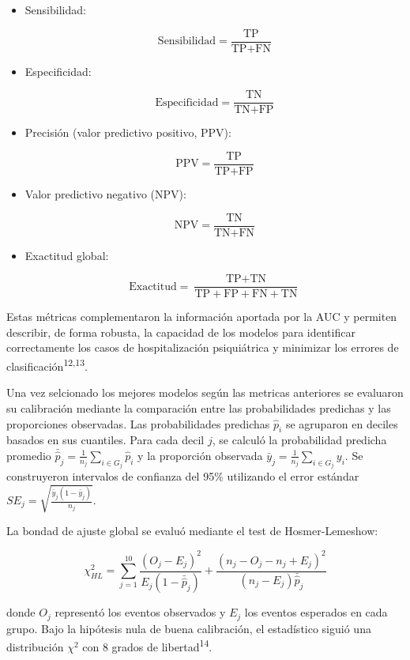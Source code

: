 \documentclass[
  spanish,
  10pt,
]{article}
\begin{document}
\begin{itemize}
\item
  Sensibilidad:

  \[
  \text{Sensibilidad} = \frac{\text{TP}}{\text{TP}+\text{FN}}
  \]
\item
  Especificidad:

  \[
  \text{Especificidad} = \frac{\text{TN}}{\text{TN}+\text{FP}}
  \]
\item
  Precisión (valor predictivo positivo, PPV):

  \[
  \text{PPV} = \frac{\text{TP}}{\text{TP}+\text{FP}}
  \]
\item
  Valor predictivo negativo (NPV):

  \[
  \text{NPV} = \frac{\text{TN}}{\text{TN}+\text{FN}}
  \]
\item
  Exactitud global:

  \[
  \text{Exactitud} = \frac{\text{TP}+\text{TN}}{\text{TP}+\text{FP}+\text{FN}+\text{TN}}
  \]
\end{itemize}

Estas métricas complementaron la información aportada por la AUC y
permiten describir, de forma robusta, la capacidad de los modelos para
identificar correctamente los casos de hospitalización psiquiátrica y
minimizar los errores de clasificación\textsuperscript{12,13}.

Una vez selcionado los mejores modelos según las metricas anteriores se
evaluaron su calibración mediante la comparación entre las
probabilidades predichas y las proporciones observadas. Las
probabilidades predichas \(\hat{p}_i\) se agruparon en deciles basados
en sus cuantiles. Para cada decil \(j\), se calculó la probabilidad
predicha promedio
\(\bar{\hat{p}}_j = \frac{1}{n_j}\sum_{i \in G_j} \hat{p}_i\) y la
proporción observada \(\bar{y}_j = \frac{1}{n_j}\sum_{i \in G_j} y_i\).
Se construyeron intervalos de confianza del 95\% utilizando el error
estándar \(SE_j = \sqrt{\frac{\bar{y}_j(1-\bar{y}_j)}{n_j}}\).

La bondad de ajuste global se evaluó mediante el test de
Hosmer-Lemeshow:

\[\chi^2_{HL} = \sum_{j=1}^{10} \frac{(O_j - E_j)^2}{E_j(1 - \bar{\hat{p}}_j)} + \frac{(n_j - O_j - n_j + E_j)^2}{(n_j - E_j)\bar{\hat{p}}_j}\]

donde \(O_j\) representó los eventos observados y \(E_j\) los eventos
esperados en cada grupo. Bajo la hipótesis nula de buena calibración, el
estadístico siguió una distribución \(\chi^2\) con 8 grados de
libertad\textsuperscript{14}.
\end{document}
